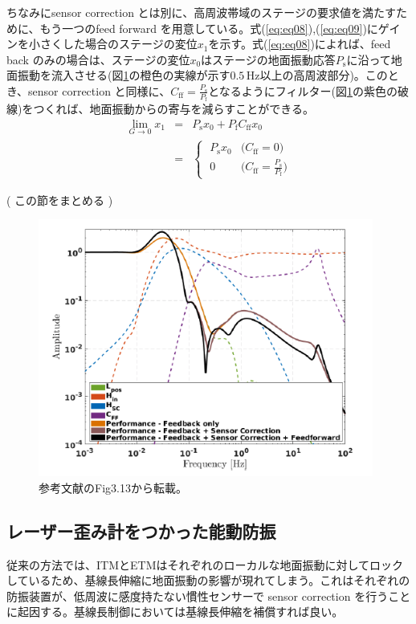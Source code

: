 \documentclass[a4paper,12pt]{jsarticle}
\begin{document}
ちなみにsensor correction とは別に、高周波帯域のステージの要求値を満たすために、もう一つのfeed forward を用意している。式(\ref{eq:eq08}),(\ref{eq:eq09})にゲインを小さくした場合のステージの変位$x_1$を示す。式(\ref{eq:eq08})によれば、feed back のみの場合は、ステージの変位$x_0$はステージの地面振動応答$P_{\mathrm{s}}$に沿って地面振動を流入させる(図\ref{img:img_pi_fb_sc_ff}の橙色の実線が示す$0.5\,\mathrm{Hz}$以上の高周波部分)。このとき、sensor correction と同様に、$C_{\mathrm{ff}}=\frac{P_{\mathrm{s}}}{P_{\mathrm{f}}}$となるようにフィルター(図\ref{img:img_pi_fb_sc_ff}の紫色の破線)をつくれば、地面振動からの寄与を減らすことができる。
\begin{eqnarray}\label{eq:eq08}
  \lim_{G \to 0} x_{1} &=& P_{\mathrm{s}}x_0 + P_{\mathrm{f}}C_{\mathrm{ff}}x_0 \\
  &=& 
  \begin{cases}\label{eq:eq09}
    \; P_{\mathrm{s}}x_{0} & \text{($C_{\mathrm{ff}}=0$)}\\
    \; 0 & \text{($C_{\mathrm{ff}}=\frac{P_{\mathrm{s}}}{P_{\mathrm{f}}}$)} 
  \end{cases}  
\end{eqnarray}

( この節をまとめる )


\begin{figure}[H]
  \begin{center}
    \includegraphics[width=11.0cm]{./img_pi_fb_sc_ff.png}
  \end{center}
  \caption{参考文献\cite{biscansD2018}のFig3.13から転載。}
  \label{img:img_pi_fb_sc_ff}
\end{figure}






\subsection{レーザー歪み計をつかった能動防振}
従来の方法では、ITMとETMはそれぞれのローカルな地面振動に対してロックしているため、基線長伸縮に地面振動の影響が現れてしまう。これはそれぞれの防振装置が、低周波に感度持たない慣性センサーで sensor correction を行うことに起因する。基線長制御においては基線長伸縮を補償すれば良い。
\end{document}
